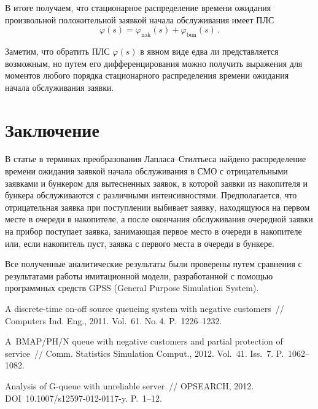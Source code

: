 \begin{multicols}{2}
В итоге получаем, что стационарное распределение времени
ожидания произвольной положительной заявкой начала обслуживания имеет ПЛС
\begin{equation*}
\varphi(s) = \varphi_{\mathrm{nak}}(s) + \varphi_{\mathrm{bun}}(s)\,.
\end{equation*}

Заметим, что обратить ПЛС $\varphi(s)$ в явном виде едва ли
представляется возможным, но путем его дифференцирования можно получить
выражения для моментов любого порядка стационарного распределения времени ожидания начала
обслуживания заявки.

\section{Заключение}

В статье в терминах преобразования Лап\-ла\-са--Стилть\-еса
найдено распределение времени ожидания заявкой 
начала обслуживания в СМО
с отрицательными заявками и бункером для вытесненных заявок,
в которой заявки из накопителя и бункера обслуживаются с различными интенсивностями.
Предполагается, что отрицательная заявка при поступлении
выбивает заявку, находящуюся на первом месте в очереди в накопителе, а
после окончания обслуживания очередной заявки на прибор поступает заявка, занимающая
первое место в очереди в накопителе или, если накопитель пуст, заявка с первого
места в очереди в бункере.

Все полученные аналитические результаты были проверены путем сравнения с результатами
работы имитационной модели, разработанной с помощью программных средств GPSS (General Purpose Simulation System).


{\small\frenchspacing
{%
\begin{thebibliography}{9}

 A discrete-time on-off source queueing system with negative customers~// 
Computers Ind. Eng., 2011. Vol.~61. No.\,4. P.~1226--1232.




 A~BMAP/PH/N queue with negative
customers and partial protection of service~//  Comm.
Statistics Simulation  Comput., 2012. Vol.~41. Iss.~7.
P.~1062--1082.

 Analysis of G-queue with
unreliable server~// OPSEARCH, 2012. DOI~10.1007/s12597-012-0117-y.
P.~1--12.


\end{thebibliography}}}
\end{multicols}
